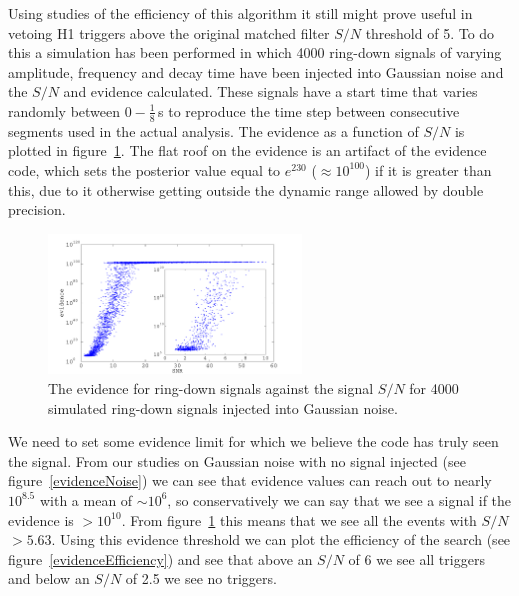Using studies of the efficiency of this algorithm it still might prove useful in vetoing H1
triggers above the original matched filter $S/N$ threshold of 5. To do this a simulation has been
performed in which 4000 ring-down signals of varying amplitude, frequency and decay time have been
injected into Gaussian noise and the $S/N$ and evidence calculated. These signals have a start time
that varies randomly between $0-\frac{1}{8}$\,s to reproduce the time step between consecutive
segments used in the actual analysis. The evidence as a function of $S/N$ is plotted in
figure~\ref{evidenceVsSNR}. The flat roof on the evidence is an artifact of the evidence code, which
sets the posterior value equal to $e^{230}$ ($\approx 10^{100}$) if it is greater than this, due to
it otherwise getting outside the dynamic range allowed by double precision.
\begin{figure}[!htbp]
\begin{center}
\includegraphics[width=0.6\textwidth]{figs/evidenceVsSNR}\caption{The evidence for ring-down
signals against the signal $S/N$ for 4000 simulated ring-down signals injected into Gaussian
noise.}\label{evidenceVsSNR}
\end{center}
\end{figure}
We need to set some evidence limit for which we believe the code has truly seen the signal. From our
studies on Gaussian noise with no signal injected (see figure~\ref{evidenceNoise}) we can see that
evidence values can reach out to nearly $10^{8.5}$ with a mean of $\sim 10^{6}$, so conservatively
we can say that we see a signal if the evidence is $> 10^{10}$. From figure~\ref{evidenceVsSNR} this
means that we see all the events with $S/N$ $> 5.63$. Using this evidence threshold we can plot the
efficiency of the search (see figure~\ref{evidenceEfficiency}) and see that above an $S/N$ of 6 we
see all triggers and below an $S/N$ of 2.5 we see no triggers.
